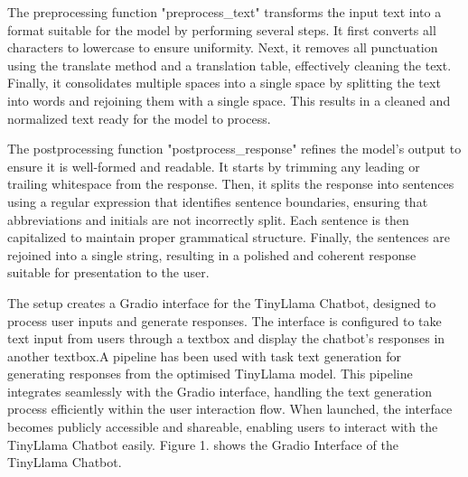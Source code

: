 \documentclass{josis}
\begin{document}
The preprocessing function "preprocess\_text" transforms the input text into a format suitable for the model by performing several steps. It first converts all characters to lowercase to ensure uniformity. Next, it removes all punctuation using the translate method and a translation table, effectively cleaning the text. Finally, it consolidates multiple spaces into a single space by splitting the text into words and rejoining them with a single space. This results in a cleaned and normalized text ready for the model to process.

The postprocessing function "postprocess\_response" refines the model's output to ensure it is well-formed and readable. It starts by trimming any leading or trailing whitespace from the response. Then, it splits the response into sentences using a regular expression that identifies sentence boundaries, ensuring that abbreviations and initials are not incorrectly split. Each sentence is then capitalized to maintain proper grammatical structure. Finally, the sentences are rejoined into a single string, resulting in a polished and coherent response suitable for presentation to the user.

The setup creates a Gradio interface for the TinyLlama Chatbot, designed to process user inputs and generate responses. The interface is configured to take text input from users through a textbox and display the chatbot's responses in another textbox.A pipeline has been used with task text generation for generating responses from the optimised TinyLlama model. This pipeline integrates seamlessly with the Gradio interface, handling the text generation process efficiently within the user interaction flow. When launched, the interface becomes publicly accessible and shareable, enabling users to interact with the TinyLlama Chatbot easily. Figure 1. shows the Gradio Interface of the TinyLlama Chatbot.
\end{document}
